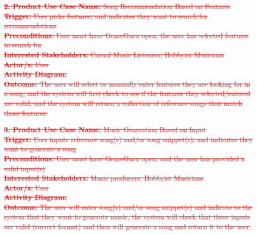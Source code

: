 \documentclass[12pt]{article}
\begin{document}
\vspace{1cm}

\textcolor{red}{\sout{\noindent \textbf{2. Product Use Case Name:} Song Recommendation Based on Features}} \\
\textcolor{red}{\sout{\textbf{Trigger:} User picks features, and indicates they want to search for recommendations}} \\
\textcolor{red}{\sout{\textbf{Preconditions:} User must have GenreGuru open, the user has selected features to search for}} \\
\textcolor{red}{\sout{\textbf{Interested Stakeholders:} Casual Music Listeners, Hobbyist Musicians}} \\
\textcolor{red}{\sout{\textbf{Actor/s:} User}} \\
\textcolor{red}{\sout{\textbf{Activity Diagram:}}} \\
\textcolor{red}{\sout{\textbf{Outcome:} The user will select or manually enter features they are looking for in a song, and the system will first check to see if the features they selected/entered are valid, and the system will return a collection of reference songs that match those features.}}

\vspace{1cm}

\textcolor{red}{\sout{\noindent \textbf{3. Product Use Case Name:} Music Generation Based on Input}} \\
\textcolor{red}{\sout{\textbf{Trigger:} User inputs reference song(s) and/or song snippet(s), and indicates they want to generate a song}} \\
\textcolor{red}{\sout{\textbf{Preconditions:} User must have GenreGuru open, and the user has provided a valid input(s)}} \\
\textcolor{red}{\sout{\textbf{Interested Stakeholders:} Music producers, Hobbyist Musicians}} \\
\textcolor{red}{\sout{\textbf{Actor/s:} User}} \\
\textcolor{red}{\sout{\textbf{Activity Diagram:}}} \\
\textcolor{red}{\sout{\textbf{Outcome:} The user will enter song(s) and/or song snippet(s) and indicate to the system that they want to generate music, the system will check that these inputs are valid (correct format) and then will generate a song and return it to the user.}}
\end{document}
